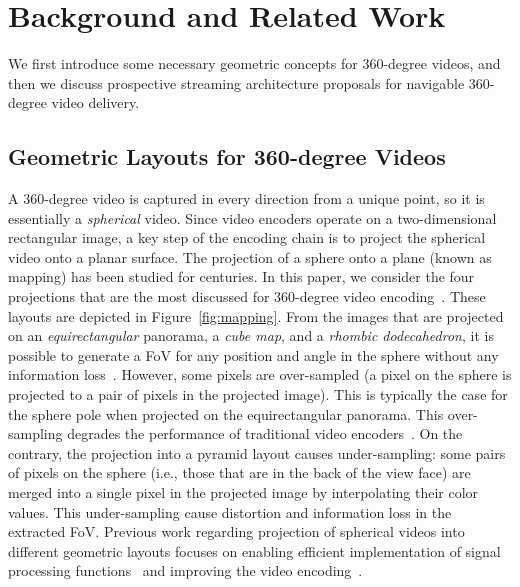 \section{Background and Related Work}
\label{sec:related}

We first introduce some necessary geometric concepts for 360-degree videos, and then we discuss
prospective streaming architecture proposals for navigable 360-degree video delivery.

\subsection{Geometric Layouts for 360-degree Videos}

A 360-degree video is captured in every direction from a unique
point, so it is essentially a \emph{spherical} video. Since video encoders operate on a
two-dimensional rectangular image, a key step of the encoding chain is to project the spherical
video onto a planar
surface.
The projection of a sphere onto a plane (known as mapping) has been studied
for centuries. In this paper, we consider the four projections that are the most discussed for
360-degree video encoding~\cite{yu_framework_2015}. These layouts are depicted in
Figure~\ref{fig:mapping}.
From
the images that are
projected on an \textit{equirectangular} panorama, a \textit{cube map}, and a
\textit{rhombic dodecahedron}, it is possible
to generate a \ac{FoV}
for any position and angle in the sphere without any information
loss~\cite{Ng2005, fu_rhombic_2009}. However, some pixels
are over-sampled (a pixel on the sphere is projected to a pair of pixels in the
projected image). This is typically the case for the sphere pole when projected on the equirectangular panorama.
This over-sampling degrades the
performance of traditional video encoders~\cite{wojciechowski_h.264_2006,
yu_framework_2015}.
On the
contrary, the projection into a pyramid layout causes under-sampling: some pairs of pixels
on the sphere (i.e., those that are
in the back of the view face) are merged into a single pixel in
the projected image by interpolating their
color values. This under-sampling cause distortion and information loss in the extracted
FoV.
Previous work regarding projection of spherical videos into different
geometric layouts focuses on enabling efficient implementation of signal processing
functions~\cite{kazhdan_metric-aware_2010} and improving the video
encoding~\cite{tosic_low_2009}.

